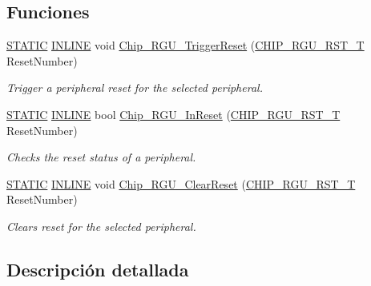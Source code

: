\subsection*{Funciones}
\begin{DoxyCompactItemize}
\item 
\hyperlink{group___l_p_c___types___public___macros_ga10b2d890d871e1489bb02b7e70d9bdfb}{S\+T\+A\+T\+IC} \hyperlink{spifi__18xx__43xx_8h_a2eb6f9e0395b47b8d5e3eeae4fe0c116}{I\+N\+L\+I\+NE} void \hyperlink{group___r_g_u__18_x_x__43_x_x_ga3cc30f9a3adbdba9866e6a80cb9eb71d}{Chip\+\_\+\+R\+G\+U\+\_\+\+Trigger\+Reset} (\hyperlink{group___r_g_u__18_x_x__43_x_x_gaf76b0dbb78e73bbcd44948364417ae60}{C\+H\+I\+P\+\_\+\+R\+G\+U\+\_\+\+R\+S\+T\+\_\+T} Reset\+Number)
\begin{DoxyCompactList}\small\item\em Trigger a peripheral reset for the selected peripheral. \end{DoxyCompactList}\item 
\hyperlink{group___l_p_c___types___public___macros_ga10b2d890d871e1489bb02b7e70d9bdfb}{S\+T\+A\+T\+IC} \hyperlink{spifi__18xx__43xx_8h_a2eb6f9e0395b47b8d5e3eeae4fe0c116}{I\+N\+L\+I\+NE} bool \hyperlink{group___r_g_u__18_x_x__43_x_x_gabada148b5dec002cb3e8a748e6613194}{Chip\+\_\+\+R\+G\+U\+\_\+\+In\+Reset} (\hyperlink{group___r_g_u__18_x_x__43_x_x_gaf76b0dbb78e73bbcd44948364417ae60}{C\+H\+I\+P\+\_\+\+R\+G\+U\+\_\+\+R\+S\+T\+\_\+T} Reset\+Number)
\begin{DoxyCompactList}\small\item\em Checks the reset status of a peripheral. \end{DoxyCompactList}\item 
\hyperlink{group___l_p_c___types___public___macros_ga10b2d890d871e1489bb02b7e70d9bdfb}{S\+T\+A\+T\+IC} \hyperlink{spifi__18xx__43xx_8h_a2eb6f9e0395b47b8d5e3eeae4fe0c116}{I\+N\+L\+I\+NE} void \hyperlink{group___r_g_u__18_x_x__43_x_x_gaae3ec369bc443e52bd8d76d759d79d9c}{Chip\+\_\+\+R\+G\+U\+\_\+\+Clear\+Reset} (\hyperlink{group___r_g_u__18_x_x__43_x_x_gaf76b0dbb78e73bbcd44948364417ae60}{C\+H\+I\+P\+\_\+\+R\+G\+U\+\_\+\+R\+S\+T\+\_\+T} Reset\+Number)
\begin{DoxyCompactList}\small\item\em Clears reset for the selected peripheral. \end{DoxyCompactList}\end{DoxyCompactItemize}


\subsection{Descripción detallada}


